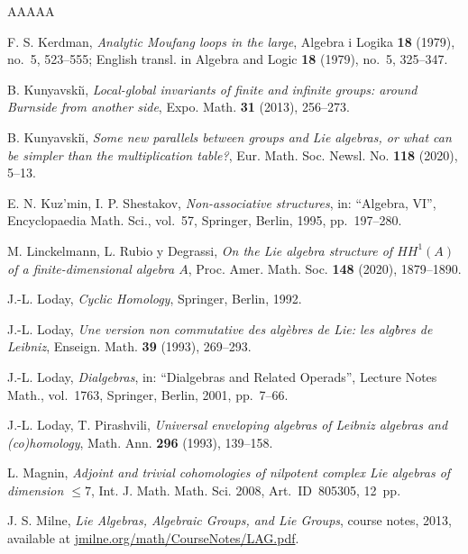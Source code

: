 \documentclass[11pt,reqno]{amsart}
\numberwithin{equation}{section}
\theoremstyle{definition}
\begin{document}
\begin{thebibliography}{AAAAA}



F. S. Kerdman,
\emph{Analytic Moufang loops in the large},
Algebra i Logika {\bf 18} (1979), no.~5, 523--555;
English transl. in Algebra and Logic {\bf 18} (1979), no.~5, 325--347.


B. Kunyavski\u\i ,
\emph{Local-global invariants of finite and infinite groups: around Burnside from another side},
Expo. Math. {\bf 31} (2013), 256--273.

B. Kunyavski\u\i ,
\emph{Some new parallels between groups and Lie algebras, or what can be simpler than the multiplication table?},
Eur. Math. Soc. Newsl. No. {\bf 118} (2020), 5--13.

E. N. Kuz'min, I. P. Shestakov,
\emph{Non-associative structures}, in: ``Algebra, VI'',
Encyclopaedia Math. Sci., vol.~57, Springer, Berlin, 1995, pp.~197--280.

M. Linckelmann, L. Rubio y Degrassi,
{\it On the Lie algebra structure of $HH^1(A)$ of a finite-dimensional algebra $A$},
Proc. Amer. Math. Soc. {\bf 148} (2020), 1879--1890.

J.-L. Loday,
\emph {Cyclic Homology},
Springer, Berlin, 1992.

J.-L. Loday,
\emph{Une version non commutative des alg\`ebres de Lie: les alg\`bres de Leibniz},
Enseign. Math. {\bf 39} (1993), 269--293.

J.-L. Loday,
\emph{Dialgebras},
in: ``Dialgebras and Related Operads'',
Lecture Notes Math., vol.~1763, Springer, Berlin, 2001, pp.~7--66.

J.-L. Loday, T. Pirashvili,
\emph{Universal enveloping algebras of Leibniz algebras and (co)homology},
Math. Ann. {\bf 296} (1993), 139--158.

L. Magnin,
\emph{Adjoint and trivial cohomologies of nilpotent complex Lie algebras of dimension $\le 7$},
Int. J. Math. Math. Sci. 2008, Art.~ID~805305, 12~pp.


J. S. Milne,
{\it Lie Algebras, Algebraic Groups, and Lie Groups}, course notes, 2013, available at
\url{jmilne.org/math/CourseNotes/LAG.pdf}.



\end{thebibliography}
\end{document}
